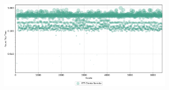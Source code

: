 \begin{apendicesenv}
\begin{figure}[htbp!]
\begin{subfigure}[t]{0.5\textwidth}
        \includegraphics[width=1\textwidth, height=120pt]{USPSC-img/output/cropped/2-mitm_arp-rttp.png}
    \end{subfigure}%
\end{figure}


\end{apendicesenv}

